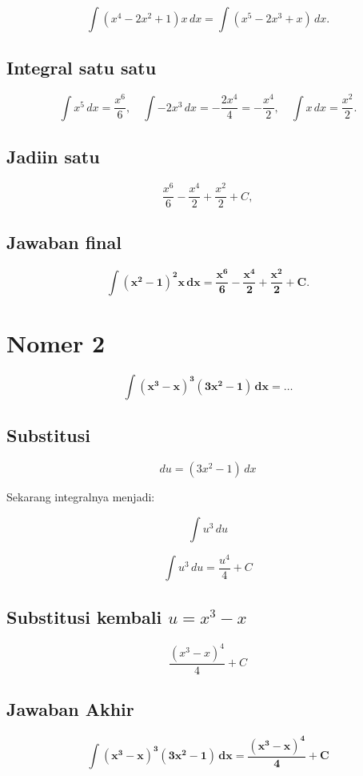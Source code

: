 \documentclass{article}
\begin{document}
\[
\int (x^4 - 2x^2 + 1) x \, dx = \int (x^5 - 2x^3 + x) \, dx.
\]

\subsection{Integral satu satu}

\[
\int x^5 \, dx = \frac{x^6}{6}, \quad \int -2x^3 \, dx = -\frac{2x^4}{4} = -\frac{x^4}{2}, \quad \int x \, dx = \frac{x^2}{2}.
\]

\subsection{ Jadiin satu}

\[
\frac{x^6}{6} - \frac{x^4}{2} + \frac{x^2}{2} + C,
\]

\subsection{Jawaban final}
\[
\bm{
\int \left(x^2 - 1\right)^2 x \, dx = \frac{x^6}{6} - \frac{x^4}{2} + \frac{x^2}{2} + C.
}
\]


\pagebreak

\section{Nomer 2}
\[
\bm{
\int \left(x^3 - x\right)^3 \left(3x^2 - 1\right) \, dx = \ldots
}
\]

\subsection{Substitusi}

\[
du = (3x^2 - 1) \, dx
\]

Sekarang integralnya menjadi:

\[
\int u^3 \, du
\]

\[
\int u^3 \, du = \frac{u^4}{4} + C
\]

\subsection{Substitusi kembali \( u = x^3 - x \)}

\[
\frac{(x^3 - x)^4}{4} + C
\]

\subsection{Jawaban Akhir}

\[
\bm{
\int \left(x^3 - x\right)^3 \left(3x^2 - 1\right) \, dx = \frac{(x^3 - x)^4}{4} + C
}
\]
\end{document}
